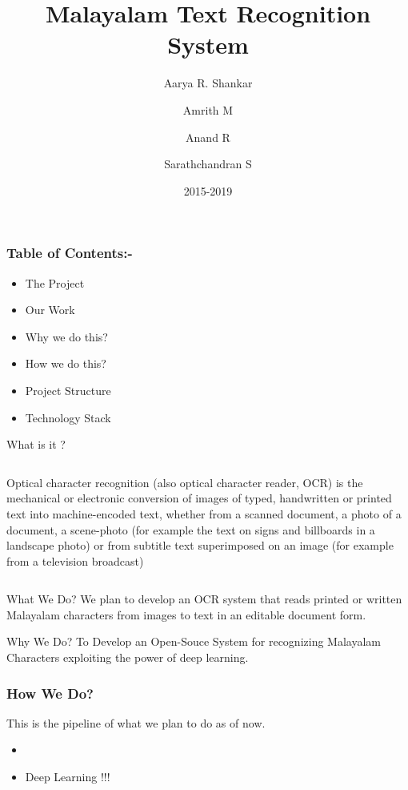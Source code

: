 \documentclass{beamer}
\title{Malayalam Text Recognition System}
\author{Aarya R. Shankar
			\and Amrith M
				 \and Anand R
					\and Sarathchandran S}
\institute{Department of Computer Science\and College of Engineering,Trivandrum}
\date{2015-2019}
\begin{document}
\frame{\titlepage}


\begin{frame}
\frametitle{Table of Contents:-}
\begin{itemize}
\item The Project
\item Our Work
\item Why we do  this?
\item How we do this?
\item Project Structure
\item Technology Stack
\end{itemize}

\end{frame}


\begin{frame}{What is it ?}

    \begin{columns}[c] %
    \column{\textwidth} %
     Optical character recognition (also optical character reader, OCR) is the mechanical or electronic conversion of images of typed, 
handwritten or printed text into machine-encoded text, whether from a scanned document, a photo of a document, a scene-photo (for example the 
text on signs and billboards in a landscape photo) or from subtitle text superimposed on an image (for example from a television broadcast)
    \end{columns}
\end{frame}



\begin{frame}{What We Do?}
     We plan to develop an OCR system that reads printed or written Malayalam characters from images to text in an editable document form.
\end{frame}

\begin{frame}{Why We Do?}
     To Develop an Open-Souce System for recognizing Malayalam Characters exploiting the power of deep learning.
\end{frame}



\begin{frame}
\frametitle{How We Do?}
This is the pipeline of what we plan to do as of now. 
 
\begin{itemize}
 \item{}
 \item<2-> Deep Learning !!!
\end{itemize}
 
\end{frame}
\end{document}
